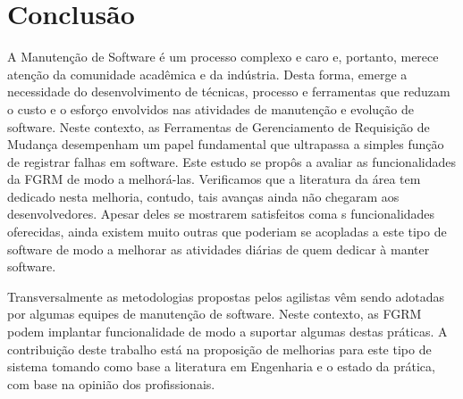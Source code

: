 \chapter{Conclusão}
\label{ch:conclusao_trab_futuros}

A Manutenção de Software é um processo complexo e caro e, portanto,  merece
atenção da comunidade acadêmica e da indústria. Desta forma, emerge a
necessidade do desenvolvimento de técnicas, processo e ferramentas que reduzam o
custo e o esforço envolvidos nas atividades de manutenção e evolução de
software. Neste contexto, as Ferramentas de Gerenciamento de Requisição de
Mudança desempenham um papel fundamental que ultrapassa a simples função de
registrar falhas em software. Este estudo se propôs a avaliar as funcionalidades
da FGRM de modo a melhorá-las. Verificamos que a literatura da área tem dedicado
nesta melhoria, contudo, tais avanças ainda não chegaram aos desenvolvedores.
Apesar deles se mostrarem satisfeitos coma s funcionalidades oferecidas, ainda
existem muito outras que poderiam se acopladas a este tipo de software de modo a
melhorar as atividades diárias de quem dedicar à manter software.

Transversalmente as metodologias propostas pelos agilistas vêm sendo adotadas
por algumas equipes de manutenção de software. Neste contexto, as FGRM podem
implantar funcionalidade de modo a suportar algumas destas práticas. A
contribuição deste trabalho está na proposição de melhorias para este tipo de
sistema tomando como base a literatura em Engenharia e o estado da prática, com
base na opinião dos profissionais.
